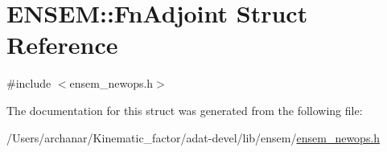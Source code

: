 \hypertarget{structENSEM_1_1FnAdjoint}{}\section{E\+N\+S\+EM\+:\+:Fn\+Adjoint Struct Reference}
\label{structENSEM_1_1FnAdjoint}


{\ttfamily \#include $<$ensem\+\_\+newops.\+h$>$}



The documentation for this struct was generated from the following file\+:\begin{DoxyCompactItemize}
\item 
/\+Users/archanar/\+Kinematic\+\_\+factor/adat-\/devel/lib/ensem/\mbox{\hyperlink{adat-devel_2lib_2ensem_2ensem__newops_8h}{ensem\+\_\+newops.\+h}}\end{DoxyCompactItemize}
